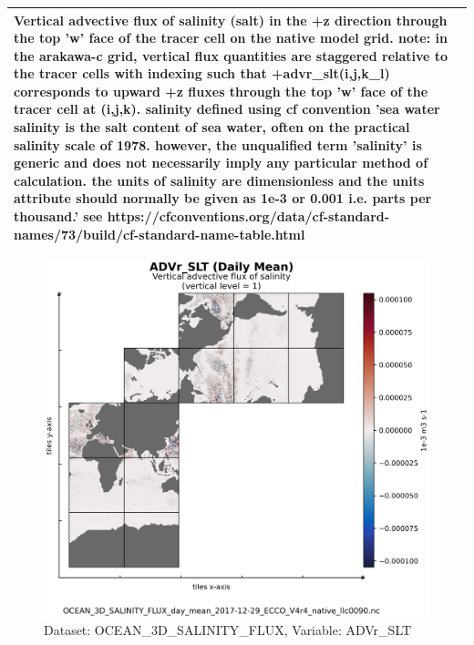 \begin{longtable}{|m{}|m{}|m{}|m{}|}
\multicolumn{4}{|p{1\textwidth}|}{\footnotesize{{Vertical advective flux of salinity (salt) in the +z direction through the top 'w' face of the tracer cell on the native model grid. note: in the arakawa-c grid, vertical flux quantities are staggered relative to the tracer cells with indexing such that +advr\_slt(i,j,k\_l) corresponds to upward +z fluxes through the top 'w' face of the tracer cell at (i,j,k). salinity defined using cf convention 'sea water salinity is the salt content of sea water, often on the practical salinity scale of 1978. however, the unqualified term 'salinity' is generic and does not necessarily imply any particular method of calculation. the units of salinity are dimensionless and the units attribute should normally be given as 1e-3 or 0.001 i.e. parts per thousand.' see https://cfconventions.org/data/cf-standard-names/73/build/cf-standard-name-table.html}}} \\ \hline
\end{longtable}

\begin{figure}[H]
\centering
\includegraphics[scale=0.55]{../images/plots/native_plots/Ocean_Three-Dimensional_Salinity_Fluxes/ADVr_SLT.png}
\caption{Dataset: OCEAN\_3D\_SALINITY\_FLUX, Variable: ADVr\_SLT}
\label{tab:table-OCEAN_3D_SALINITY_FLUX_ADVr_SLT-Plot}
\end{figure}
\newpage
\pagebreak
